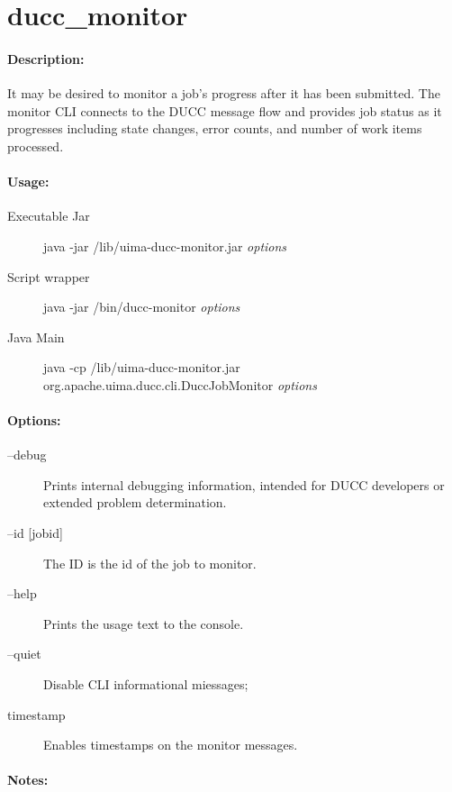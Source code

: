\ifpdf
\else
{}
\fi
    \section{ducc\_monitor}

    \paragraph{Description:}
    
    It may be desired to monitor a job's progress after it has been submitted. The monitor CLI 
    connects to the DUCC message flow and provides job status as it progresses including state 
    changes, error counts, and number of work items processed. 
    
    \paragraph{Usage:}
    \begin{description}
    \item[Executable Jar] java -jar \ducchome/lib/uima-ducc-monitor.jar {\em options}
    \item[Script wrapper] java -jar \ducchome/bin/ducc-monitor {\em options}
    \item[Java Main]      java -cp \ducchome/lib/uima-ducc-monitor.jar org.apache.uima.ducc.cli.DuccJobMonitor {\em options}
    \end{description}

    \paragraph{Options:}
    \begin{description}
        \item[--debug ]          
          Prints internal debugging information, intended for DUCC developers or extended problem determination.
        \item[--id {[jobid]}]
          The ID is the id of the job to monitor.
        \item[--help]
          Prints the usage text to the console. 
        \item[--quiet] 
          Disable CLI informational miessages;
        \item[timestamp]
          Enables timestamps on the monitor messages.
     \end{description}
        
    \paragraph{Notes:}
